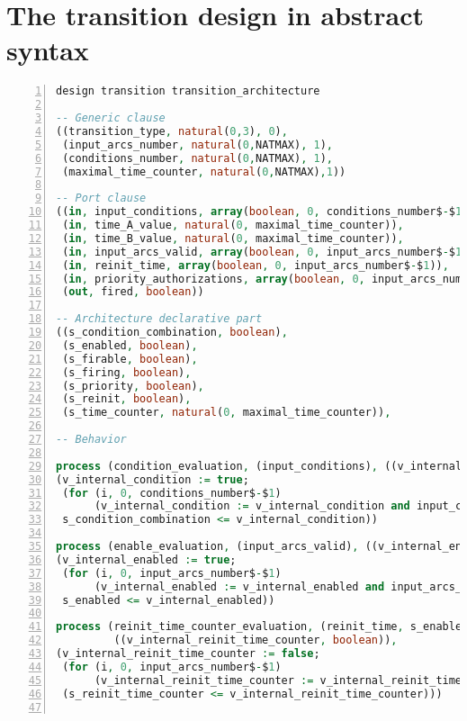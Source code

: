 \section{The transition design in abstract \hvhdl{} syntax}
\label{app:trans-design}

\begin{lstlisting}[language=VHDL,label={lst:trans-design-abss},caption={The \texttt{transition} design in \hvhdl{} abstract syntax.},framexleftmargin=1.5em,xleftmargin=2em,numbers=left, numberstyle=\tiny\ttfamily]
design transition transition_architecture

-- Generic clause
((transition_type, natural(0,3), 0),
 (input_arcs_number, natural(0,NATMAX), 1),
 (conditions_number, natural(0,NATMAX), 1),
 (maximal_time_counter, natural(0,NATMAX),1))

-- Port clause
((in, input_conditions, array(boolean, 0, conditions_number$-$1),
 (in, time_A_value, natural(0, maximal_time_counter)),
 (in, time_B_value, natural(0, maximal_time_counter)),
 (in, input_arcs_valid, array(boolean, 0, input_arcs_number$-$1)),
 (in, reinit_time, array(boolean, 0, input_arcs_number$-$1)),
 (in, priority_authorizations, array(boolean, 0, input_arcs_number$-$1)),
 (out, fired, boolean))

-- Architecture declarative part
((s_condition_combination, boolean),
 (s_enabled, boolean),
 (s_firable, boolean),
 (s_firing, boolean),
 (s_priority, boolean),
 (s_reinit, boolean),
 (s_time_counter, natural(0, maximal_time_counter)),

-- Behavior

process (condition_evaluation, (input_conditions), ((v_internal_condition, boolean)),
(v_internal_condition := true;
 (for (i, 0, conditions_number$-$1)
      (v_internal_condition := v_internal_condition and input_conditions(i)));
 s_condition_combination <= v_internal_condition))
  
process (enable_evaluation, (input_arcs_valid), ((v_internal_enabled, boolean)),
(v_internal_enabled := true;
 (for (i, 0, input_arcs_number$-$1)
      (v_internal_enabled := v_internal_enabled and input_arcs_valid(i)));
 s_enabled <= v_internal_enabled))

process (reinit_time_counter_evaluation, (reinit_time, s_enabled),
         ((v_internal_reinit_time_counter, boolean)),
(v_internal_reinit_time_counter := false;
 (for (i, 0, input_arcs_number$-$1)
      (v_internal_reinit_time_counter := v_internal_reinit_time_counter or reinit_time(i)));
 (s_reinit_time_counter <= v_internal_reinit_time_counter)))


\end{lstlisting}
